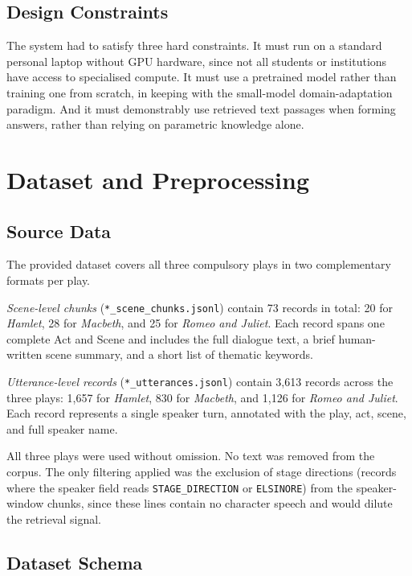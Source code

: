 \documentclass[10pt,conference]{IEEEtran}
\begin{document}
\subsection{Design Constraints}

The system had to satisfy three hard constraints. It must run on a
standard personal laptop without GPU hardware, since not all students
or institutions have access to specialised compute. It must use a
pretrained model rather than training one from scratch, in keeping
with the small-model domain-adaptation paradigm. And it must
demonstrably use retrieved text passages when forming answers, rather
than relying on parametric knowledge alone.

\section{Dataset and Preprocessing}
\label{sec:dataset}

\subsection{Source Data}

The provided dataset covers all three compulsory plays in two
complementary formats per play.

\textit{Scene-level chunks} (\texttt{*\_scene\_chunks.jsonl}) contain
73 records in total: 20 for \textit{Hamlet}, 28 for \textit{Macbeth},
and 25 for \textit{Romeo and Juliet}. Each record spans one complete
Act and Scene and includes the full dialogue text, a brief
human-written scene summary, and a short list of thematic keywords.

\textit{Utterance-level records} (\texttt{*\_utterances.jsonl})
contain 3,613 records across the three plays: 1,657 for
\textit{Hamlet}, 830 for \textit{Macbeth}, and 1,126 for
\textit{Romeo and Juliet}. Each record represents a single speaker
turn, annotated with the play, act, scene, and full speaker name.

All three plays were used without omission. No text was removed from
the corpus. The only filtering applied was the exclusion of stage
directions (records where the speaker field reads
\texttt{STAGE\_DIRECTION} or \texttt{ELSINORE}) from the
speaker-window chunks, since these lines contain no character speech
and would dilute the retrieval signal.

\subsection{Dataset Schema}
\end{document}
